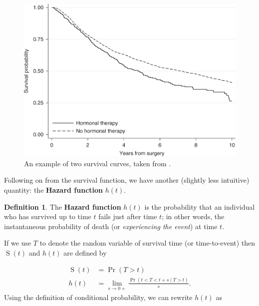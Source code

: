 \documentclass[
  openany]{book}
\theoremstyle{definition}
\newtheorem{definition}{Definition}[chapter]
\theoremstyle{definition}
\theoremstyle{definition}
\theoremstyle{definition}
\theoremstyle{remark}
\begin{document}
\begin{figure}
\centering
\includegraphics{images/survival_eg.png}
\caption{\label{fig:egsurvival}An example of two survival curves, taken from \citet{syriopoulou2022standardised}.}
\end{figure}

Following on from the survival function, we have another (slightly less intuitive) quantity: the \textbf{Hazard function} \(h\left(t\right)\).

\begin{definition}
The \textbf{Hazard function} \(h(t)\) is the probability that an individual who has survived up to time \(t\) fails just after time \(t\); in other words, the instantaneous probability of death (or \emph{experiencing the event}) at time \(t\).
\end{definition}

If we use \(T\) to denote the random variable of survival time (or time-to-event) then \(\operatorname{S}\left(t\right)\) and \(h(t)\) are defined by

\[
\begin{aligned}
\operatorname{S}\left(t\right)&= \operatorname{Pr}\left(T>t\right)\\
h\left(t\right) & = \lim\limits_{s\rightarrow{0+}}\frac{\operatorname{Pr}\left(t<T<t+s\mid{T>t}\right)}{s}.
\end{aligned}
\]
Using the definition of conditional probability, we can rewrite \(h(t)\) as
\end{document}
